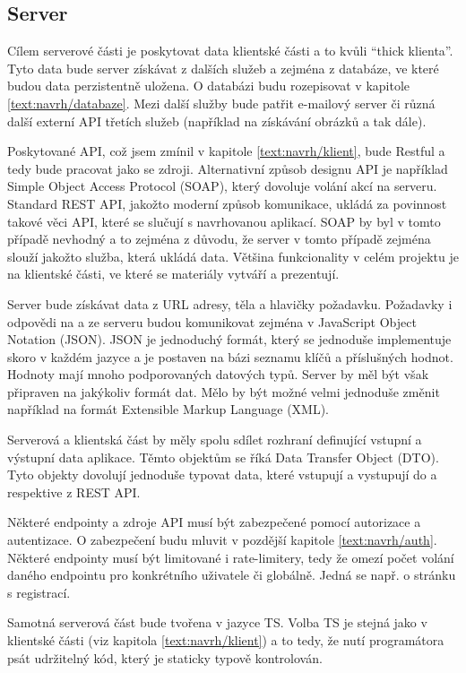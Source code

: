 \subsection{Server}\label{text:navrh/server}

Cílem serverové části je poskytovat data klientské části a to kvůli \enquote{thick klienta}. 
Tyto data bude server získávat z dalších služeb a zejména z databáze, ve které budou data perzistentně uložena.
O databázi budu rozepisovat v kapitole \ref{text:navrh/databaze}.
Mezi další služby bude patřit e-mailový server či různá další externí API třetích služeb (například na získávání obrázků a tak dále).

Poskytované API, což jsem zmínil v kapitole \ref{text:navrh/klient}, bude Restful a tedy bude pracovat jako se zdroji. 
Alternativní způsob designu API je například Simple Object Access Protocol (SOAP), který dovoluje volání akcí na serveru.
Standard REST API, jakožto moderní způsob komunikace, ukládá za povinnost takové věci API, které se slučují s navrhovanou aplikací.
SOAP by byl v tomto případě nevhodný a to zejména z důvodu, že server v tomto případě zejména slouží jakožto služba, která ukládá data.
Většina funkcionality v celém projektu je na klientské části, ve které se materiály vytváří a prezentují.

Server bude získávat data z URL adresy, těla a hlavičky požadavku.
Požadavky i odpovědi na a ze serveru budou komunikovat zejména v JavaScript Object Notation (JSON).
JSON je jednoduchý formát, který se jednoduše implementuje skoro v každém jazyce a je postaven na bázi seznamu klíčů a příslušných hodnot.
Hodnoty mají mnoho podporovaných datových typů.
Server by měl být však připraven na jakýkoliv formát dat.
Mělo by být možné velmi jednoduše změnit například na formát Extensible Markup Language (XML).

Serverová a klientská část by měly spolu sdílet rozhraní definující vstupní a výstupní data aplikace.
Těmto objektům se říká Data Transfer Object (DTO).
Tyto objekty dovolují jednoduše typovat data, které vstupují a vystupují do a respektive z REST API.

Některé endpointy a zdroje API musí být zabezpečené pomocí autorizace a autentizace. 
O zabezpečení budu mluvit v pozdější kapitole \ref{text:navrh/auth}.
Některé endpointy musí být limitované i rate-limitery, tedy že omezí počet volání daného endpointu pro konkrétního uživatele či globálně.
Jedná se např. o stránku s registrací.

Samotná serverová část bude tvořena v jazyce TS.
Volba TS je stejná jako v klientské části (viz kapitola \ref{text:navrh/klient}) a to tedy, že nutí programátora psát udržitelný kód, který je staticky typově kontrolován.

